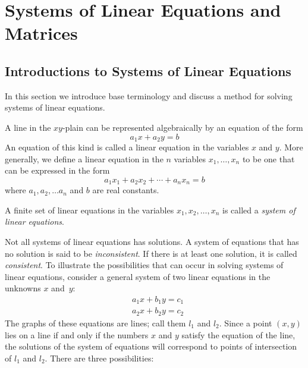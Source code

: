 
\chapter{Systems of Linear Equations and Matrices}

\section{Introductions to Systems of Linear Equations}


In this section we introduce base terminology and discuss a method for
solving systems of linear equations.

A line in the $xy$-plain can be represented algebraically by an equation
of the form
%
%
\begin{equation*}
   a_1 x + a_2 y = b
\end{equation*}
%
An equation of this kind is called a linear equation in the variables
$x$ and $y$.  More generally, we define a linear equation in the $n$
variables $x_1,\ldots,x_n$ to be one that can be expressed in the form
%
\begin{equation}
   a_1 x_1 + a_2 x_2 + \cdots + a_n x_n = b 
\end{equation}
%
where $a_1, a_2, \ldots a_n$ and $b$ are real constants.

\begin{definition}
A finite set of linear equations in the variables $x_1, x_2, \ldots,
x_n$ is called a {\it system of linear equations}. 
\end{definition}

Not all systems of linear equations has solutions.  A system of
equations that has no solution is said to be {\it inconsistent}.  If
there is at least one solution, it is called {\it consistent}.  To
illustrate the possibilities that can occur in solving systems of linear
equations, consider a general system of two linear equations in the
unknowns $x$ and~$y$:
%
%
\begin{align*}
  & a_1 x + b_1 y = c_1  \\
  & a_2 x + b_2 y = c_2
\end{align*}
%
The graphs of these equations are lines; call them $l_1$ and $l_2$.
Since a point $(x,y)$ lies on a line if and only if the numbers $x$ and
$y$ satisfy the equation of the line, the solutions of the system of
equations will correspond to points of intersection of $l_1$ and $l_2$.
There are three possibilities:

